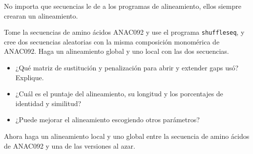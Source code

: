 \documentclass[letter,11pt]{book}
\begin{document}
No importa que secuencias le de a los programas de alineamiento, ellos siempre crearan un alineamiento.

Tome la secuencias de amino ácidos ANAC092 y use el programa \Verb+shuffleseq+, y cree dos secuencias aleatorias con la misma composición monomérica de ANAC092. Haga un alineamiento global  y uno local con las dos secuencias.

{\color{red}
\begin{itemize}
\item ¿Qué matriz de sustitución y penalización para abrir y extender gaps usó? Explique.
\item ¿Cuál es el puntaje del alineamiento, su longitud y los porcentajes de identidad y similitud?
\item ¿Puede mejorar el alineamiento escogiendo otros parámetros?
\end{itemize}
}

Ahora haga un alineamiento local y uno global entre la secuencia de amino ácidos de ANAC092 y una de las versiones al azar.
\end{document}
